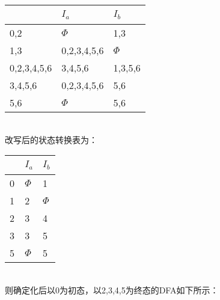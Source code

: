 \documentclass{article}
\begin{document}
\begin{table}[h]
    \centering
\begin{tabular}{|p{5cm}<{\centering}|p{5cm}<{\centering}|p{5cm}<{\centering}|}   
    \hline
    \ & $I_a$ & $I_b$ \\
    \hline
    0,2 & $\Phi$ & 1,3 \\
    \hline
    1,3 & 0,2,3,4,5,6 & $\Phi$ \\
    \hline
    0,2,3,4,5,6 & 3,4,5,6 & 1,3,5,6 \\
    \hline
    3,4,5,6 & 0,2,3,4,5,6 & 5,6 \\
    \hline
    5,6 & $\Phi$ & 5,6 \\
    \hline
\end{tabular}
\end{table}
\\
改写后的状态转换表为：
\begin{table}[h]
    \centering
\begin{tabular}{|p{5cm}<{\centering}|p{5cm}<{\centering}|p{5cm}<{\centering}|}   
    \hline
    \ & $I_a$ & $I_b$ \\
    \hline
    0 & $\Phi$ & 1 \\
    \hline
    1 & 2 & $\Phi$ \\
    \hline
    2 & 3 & 4 \\
    \hline
    3 & 3 & 5 \\
    \hline
    5 & $\Phi$ & 5 \\
    \hline
\end{tabular}
\end{table}
\\
则确定化后以0为初态，以2,3,4,5为终态的DFA如下所示：
\end{document}
